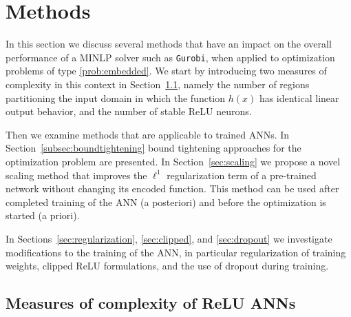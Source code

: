 \section{Methods}\label{sec:methods}

In this section we discuss several methods that have an impact on the overall performance of a MINLP solver such as \texttt{Gurobi}, when applied to optimization problems of type \eqref{prob:embedded}.
%
We start by introducing two measures of complexity in this context in Section~\ref{subsec:measures}, namely the number of regions partitioning the input domain in which the function $h(x)$ has identical linear output behavior, and the number of stable ReLU neurons.

Then we examine methods that are applicable to trained ANNs. In Section~\ref{subsec:boundtightening} bound tightening approaches for the optimization problem are presented. In Section~\ref{sec:scaling} we propose a novel scaling method that improves the $\ell^1$ regularization term of a pre-trained network without changing its encoded function. This method can be used after completed training of the ANN (a posteriori) and before the optimization is started (a priori).

In Sections~\ref{sec:regularization}, \ref{sec:clipped}, and \ref{sec:dropout} we investigate modifications to the training of the ANN, in particular regularization of training weights, clipped ReLU formulations, and the use of dropout during training.



\subsection{Measures of complexity of ReLU ANNs}\label{subsec:measures}

